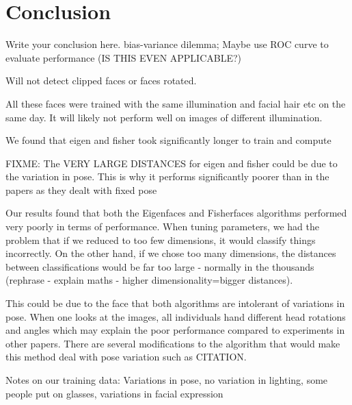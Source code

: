 \documentclass{article}
\begin{document}
\section{Conclusion}
Write your conclusion here. \citep{guyon1997scaling} \citep{belhumeur1997eigenfaces}
bias-variance dilemma; Maybe use ROC curve to evaluate performance (IS THIS EVEN APPLICABLE?)

Will not detect clipped faces or faces rotated.

All these faces were trained with the same illumination and facial hair etc on the same day. It will likely not perform well on images of different illumination.

We found that eigen and fisher took significantly longer to train and compute

FIXME: The VERY LARGE DISTANCES for eigen and fisher could be due to the variation in pose. This is why it performs significantly poorer than in the papers as they dealt with fixed pose

Our results found that both the Eigenfaces and Fisherfaces algorithms performed very poorly in terms of performance. When tuning parameters, we had the problem that if we reduced to too few dimensions, it would classify things incorrectly. On the other hand, if we chose too many dimensions, the distances between classifications would be far too large - normally in the thousands (rephrase - explain maths - higher dimensionality=bigger distances).

This could be due to the face that both algorithms are intolerant of variations in pose. When one looks at the images, all individuals hand different head rotations and angles which may explain the poor performance compared to experiments in other papers\cite{belhumeur1997eigenfaces}. There are several modifications to the algorithm that would make this method deal with pose variation such as CITATION.

Notes on our training data: Variations in pose, no variation in lighting, some people put on glasses, variations in facial expression


\nocite{*} %


\end{document}

